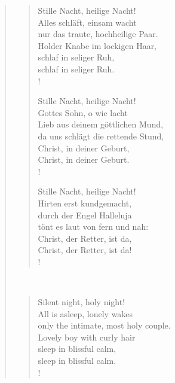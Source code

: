 \documentclass[12pt,paper=a4]{scrartcl}
\begin{document}
\begin{quote}
\begin{minipage}{.5\linewidth}
\begin{verse}
\renewcommand*{\vrightskip}{-2em}
\verselinenumbersleft
{}
\begin{patverse}
Stille Nacht, heilige Nacht!\\
Alles schläft, einsam wacht\\
nur das traute, hochheilige Paar.\\
Holder Knabe im lockigen Haar,\\
schlaf in seliger Ruh,\\
schlaf in seliger Ruh.\\!
\end{patverse}

\begin{patverse}
Stille Nacht, heilige Nacht!\\
Gottes Sohn, o wie lacht\\
Lieb aus deinem göttlichen Mund,\\
da uns schlägt die rettende Stund,\\
Christ, in deiner Geburt,\\
Christ, in deiner Geburt.\\!
\end{patverse}

\begin{patverse}
Stille Nacht, heilige Nacht!\\
Hirten erst kundgemacht,\\
durch der Engel Halleluja\\
tönt es laut von fern und nah:\\
Christ, der Retter, ist da,\\
Christ, der Retter, ist da!\\!
\end{patverse}
\end{verse}
\end{minipage}
~
\begin{minipage}{.5\linewidth}
\itshape
\begin{verse}
\begin{patverse}
Silent night, holy night!\\
All is asleep, lonely wakes\\
only the intimate, most holy couple.\\
Lovely boy with curly hair\\
sleep in blissful calm,\\
sleep in blissful calm.\\!
\end{patverse}


\end{verse}
\end{minipage}
\end{quote}
\end{document}
